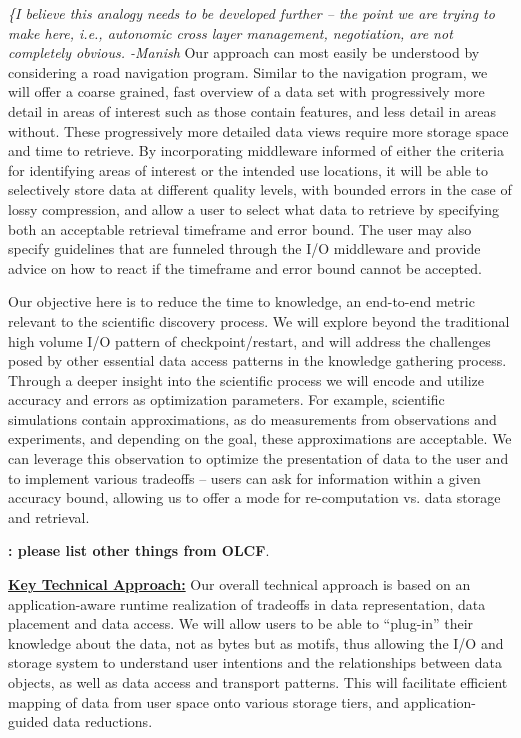 \documentclass[11pt,letterpaper]{article}
\newcommand{\manish}[1]{ {\it \color{red} \{#1 -Manish}}}
\begin{document}
\manish{I believe this analogy needs to be developed further -- the point we are trying to make here, i.e., autonomic cross layer management, negotiation, are not completely obvious.}
Our approach can most easily be understood by considering a road navigation
program. Similar to the navigation program, we will offer a coarse grained,
fast overview of a data set with progressively more detail in areas of interest
such as those contain features, and less detail in areas without. These progressively
more detailed data views require more storage space and time to retrieve. By
incorporating middleware informed of either the criteria for identifying areas of interest
or the intended use locations, it will be able to selectively store
data at different quality levels, with bounded errors in the case of lossy
compression, and allow a user to select what data to retrieve by specifying
both an acceptable retrieval timeframe and error bound. 
The user may also specify guidelines that are funneled through the I/O middleware and 
provide advice on how to react if the timeframe and error bound cannot be accepted.

Our objective here is to reduce the time to knowledge, an end-to-end metric
relevant to the scientific discovery process. We will explore beyond the traditional high
volume I/O pattern of checkpoint/restart, and will address the challenges posed
by other essential data access patterns in the knowledge gathering process.
Through a deeper insight into the scientific process we will encode and utilize
accuracy and errors as optimization parameters. 
For example, scientific simulations contain approximations, as do measurements
from observations and experiments, and depending on the goal, these
approximations are acceptable. We can leverage this observation to optimize the
presentation of data to the user and to implement various tradeoffs  -- users can 
ask for information within a given accuracy bound, allowing
us to offer a mode for re-computation vs. data storage and retrieval.

%
{\bf: please list other things from OLCF}.
%


\underline{\textbf{Key Technical Approach:}}
Our overall technical approach is based on an application-aware runtime
realization of tradeoffs in data representation, data placement and data
access. We will allow users to be able to ``plug-in'' their knowledge 
about the data, not as bytes but as motifs, thus allowing the I/O and 
storage system to understand user
intentions and the relationships between data objects, as well as data access
and transport patterns. This will facilitate efficient mapping of data from
user space onto various storage tiers, and application-guided
data reductions.
\end{document}
